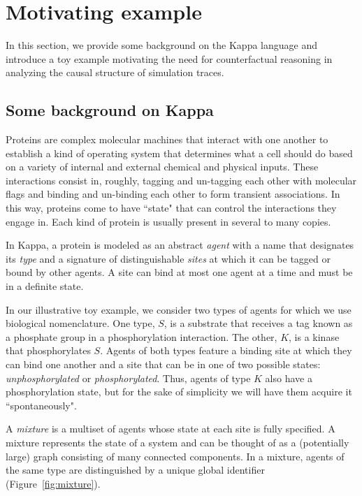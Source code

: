 
\section{Motivating example}\label{sec:example}

In this section, we provide some background on the Kappa language and
introduce a toy example motivating the need for counterfactual
reasoning in analyzing the causal structure of simulation traces.

\subsection{Some background on Kappa}\label{sec:background}

Proteins are complex molecular machines that interact with one another
to establish a kind of operating system that determines what a cell
should do based on a variety of internal and external chemical and
physical inputs. These interactions consist in, roughly, tagging and
un-tagging each other with molecular flags and binding and un-binding
each other to form transient associations. In this way, proteins come
to have ``state" that can control the interactions they engage
in. Each kind of protein is usually present in several to many copies.
 
In Kappa, a protein is modeled as an abstract \emph{agent} with a name
that designates its \emph{type} and a signature of distinguishable
\emph{sites} at which it can be tagged or bound by other agents. A
site can bind at most one agent at a time and must be in a definite
state.

In our illustrative toy example, we consider two types of agents for
which we use biological nomenclature. One type, $S$, is a substrate
that receives a tag known as a phosphate group in a phosphorylation
interaction. The other, $K$, is a kinase that phosphorylates
$S$. Agents of both types feature a binding site at which they can
bind one another and a site that can be in one of two possible states:
\emph{unphosphorylated} or \emph{phosphorylated}. Thus, agents of type
$K$ also have a phosphorylation state, but for the sake of simplicity
we will have them acquire it ``spontaneously".

A \emph{mixture} is a multiset of agents whose state at each site is
fully specified. A mixture represents the state of a system and can be
thought of as a (potentially large) graph consisting of many connected
components. In a mixture, agents of the same type are distinguished by
a unique global identifier (Figure~\ref{fig:mixture}).

